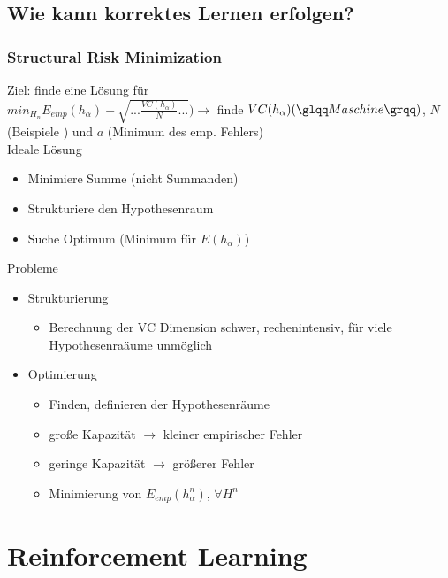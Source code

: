 \documentclass[paper=a4, fontsize=11pt]{scrartcl} %
\numberwithin{equation}{section} %
\numberwithin{figure}{section} %
\numberwithin{table}{section} %
\begin{document}
\subsection{Wie kann korrektes Lernen erfolgen?}

\subsubsection{Structural Risk Minimization}

Ziel: finde eine Lösung für\\ $min_{H_n}E_{emp}(h_\alpha) + \sqrt{... \frac{VC(h_\alpha)}{N}...}) \rightarrow$ finde $VC(h_\alpha) (\glqq Maschine \grqq)$, $N$ (\glqq Beispiele \grqq) und $a$ (\glqq Minimum des emp. Fehlers\grqq)\\ 
Ideale Lösung
\begin{itemize}
\item Minimiere Summe (nicht Summanden)
\item Strukturiere den Hypothesenraum
\item Suche Optimum (Minimum für $E(h_\alpha)$)
\end{itemize}

Probleme
\begin{itemize}
\item Strukturierung
\begin{itemize}
\item Berechnung der VC Dimension schwer, rechenintensiv, für viele Hypothesenraäume unmöglich
\end{itemize}
\item Optimierung
\begin{itemize}
\item Finden, definieren der Hypothesenräume
\item große Kapazität $\rightarrow$ kleiner empirischer Fehler
\item geringe Kapazität $\rightarrow$ größerer Fehler
\item Minimierung von $E_{emp}(h_\alpha^n)$, $\forall H^n$
\end{itemize}
\end{itemize}

\section{Reinforcement Learning}
\end{document}
